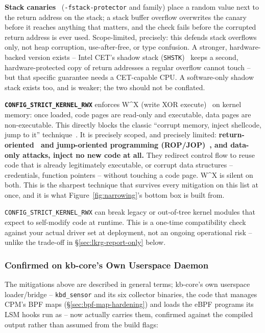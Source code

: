 \documentclass[11pt,a4paper]{article}
\begin{document}
\textbf{Stack canaries}~\cite{cowan1998} (\texttt{-fstack-protector} and family) place a
random value next to the return address on the stack; a stack buffer
overflow overwrites the canary before it reaches anything that
matters, and the check fails before the corrupted return address is
ever used. Scope-limited, precisely: this defends stack overflows
only, not heap corruption, use-after-free, or type confusion. A
stronger, hardware-backed version exists -- Intel CET's shadow stack
(\texttt{SHSTK})~\cite{intelcet} keeps a second, hardware-protected copy of return
addresses a regular overflow cannot touch -- but that specific
guarantee needs a CET-capable CPU. A software-only shadow stack exists
too, and is weaker; the two should not be conflated.

\textbf{\texttt{CONFIG\_STRICT\_KERNEL\_RWX}} enforces W\textasciicircum X
(write XOR execute)~\cite{deraadt2005} on kernel memory: once loaded, code pages are
read-only and executable, data pages are non-executable. This directly
blocks the classic ``corrupt memory, inject shellcode, jump to it''
technique~\cite{solardesigner1997}. It is precisely scoped, and precisely limited:
\textbf{return-oriented~\cite{shacham2007} and jump-oriented programming (ROP/JOP)~\cite{bletsch2011}, and
data-only attacks, inject no new code at all.} They redirect control
flow to reuse code that is already legitimately executable, or corrupt
data structures -- credentials, function pointers -- without touching
a code page. W\textasciicircum X is silent on both. This is the
sharpest technique that survives every mitigation on this list at
once, and it is what Figure~\ref{fig:narrowing}'s bottom box is built
from.

\begin{notebox}
\texttt{CONFIG\_STRICT\_KERNEL\_RWX} can break legacy or out-of-tree
kernel modules that expect to self-modify code at runtime. This is a
one-time compatibility check against your actual driver set at
deployment, not an ongoing operational risk -- unlike the trade-off in
\S\ref{sec:lkrg-report-only} below.
\end{notebox}

\subsubsection{Confirmed on kb-core's Own Userspace Daemon}
\label{sec:kbcore-hardening-confirmed}

The mitigations above are described in general terms; kb-core's
own userspace loader/bridge -- \texttt{kbd\_sensor} and its six
collector binaries, the code that manages CPM's BPF maps
(\S\ref{sec:bpf-map-hardening}) and loads the eBPF programs its LSM
hooks run as -- now actually carries them, confirmed against the
compiled output rather than assumed from the build flags:
\end{document}
